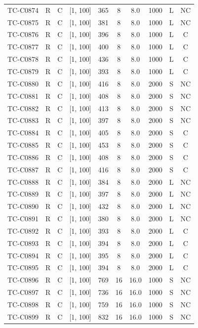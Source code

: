 \begin{longtable}{lccccccccc}
TC-C0874 & R & C & [1, 100] & 365 & 8 & 8.0 & 1000 & L & NC \\
TC-C0875 & R & C & [1, 100] & 381 & 8 & 8.0 & 1000 & L & NC \\
TC-C0876 & R & C & [1, 100] & 396 & 8 & 8.0 & 1000 & L & C \\
TC-C0877 & R & C & [1, 100] & 400 & 8 & 8.0 & 1000 & L & C \\
TC-C0878 & R & C & [1, 100] & 436 & 8 & 8.0 & 1000 & L & C \\
TC-C0879 & R & C & [1, 100] & 393 & 8 & 8.0 & 1000 & L & C \\
TC-C0880 & R & C & [1, 100] & 416 & 8 & 8.0 & 2000 & S & NC \\
TC-C0881 & R & C & [1, 100] & 408 & 8 & 8.0 & 2000 & S & NC \\
TC-C0882 & R & C & [1, 100] & 413 & 8 & 8.0 & 2000 & S & NC \\
TC-C0883 & R & C & [1, 100] & 397 & 8 & 8.0 & 2000 & S & NC \\
TC-C0884 & R & C & [1, 100] & 405 & 8 & 8.0 & 2000 & S & C \\
TC-C0885 & R & C & [1, 100] & 453 & 8 & 8.0 & 2000 & S & C \\
TC-C0886 & R & C & [1, 100] & 408 & 8 & 8.0 & 2000 & S & C \\
TC-C0887 & R & C & [1, 100] & 416 & 8 & 8.0 & 2000 & S & C \\
TC-C0888 & R & C & [1, 100] & 384 & 8 & 8.0 & 2000 & L & NC \\
TC-C0889 & R & C & [1, 100] & 397 & 8 & 8.0 & 2000 & L & NC \\
TC-C0890 & R & C & [1, 100] & 432 & 8 & 8.0 & 2000 & L & NC \\
TC-C0891 & R & C & [1, 100] & 380 & 8 & 8.0 & 2000 & L & NC \\
TC-C0892 & R & C & [1, 100] & 393 & 8 & 8.0 & 2000 & L & C \\
TC-C0893 & R & C & [1, 100] & 394 & 8 & 8.0 & 2000 & L & C \\
TC-C0894 & R & C & [1, 100] & 395 & 8 & 8.0 & 2000 & L & C \\
TC-C0895 & R & C & [1, 100] & 394 & 8 & 8.0 & 2000 & L & C \\
TC-C0896 & R & C & [1, 100] & 769 & 16 & 16.0 & 1000 & S & NC \\
TC-C0897 & R & C & [1, 100] & 736 & 16 & 16.0 & 1000 & S & NC \\
TC-C0898 & R & C & [1, 100] & 759 & 16 & 16.0 & 1000 & S & NC \\
TC-C0899 & R & C & [1, 100] & 832 & 16 & 16.0 & 1000 & S & NC \\

\end{longtable}

